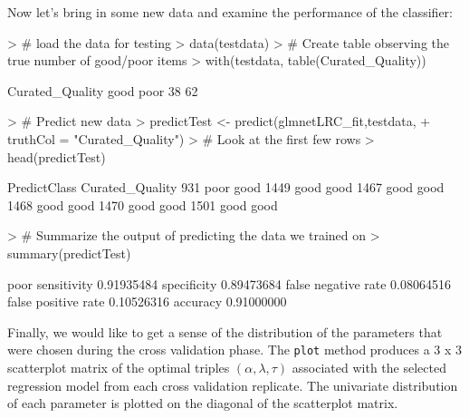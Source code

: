 \documentclass{article}
\begin{document}
\noindent Now let's bring in some new data and examine the performance of the classifier:
\begin{Schunk}
\begin{Sinput}
> # load the data for testing
> data(testdata)
> # Create table observing the true number of good/poor items 
> with(testdata, table(Curated_Quality))
\end{Sinput}
\begin{Soutput}
Curated_Quality
good poor 
  38   62 
\end{Soutput}
\begin{Sinput}
> # Predict new data
> predictTest <- predict(glmnetLRC_fit,testdata,
+                        truthCol = "Curated_Quality")
> # Look at the first few rows
> head(predictTest)
\end{Sinput}
\begin{Soutput}
     PredictClass Curated_Quality
931          poor            good
1449         good            good
1467         good            good
1468         good            good
1470         good            good
1501         good            good
\end{Soutput}
\begin{Sinput}
> # Summarize the output of predicting the data we trained on 
> summary(predictTest)
\end{Sinput}
\begin{Soutput}
                          poor
sensitivity         0.91935484
specificity         0.89473684
false negative rate 0.08064516
false positive rate 0.10526316
accuracy            0.91000000
\end{Soutput}
\end{Schunk}

\noindent Finally, we would like to get a sense of the distribution of the parameters that were chosen during the cross validation phase. The {\tt plot} method produces a 3 x 3 scatterplot matrix of the optimal triples $(\alpha, \lambda, \tau)$ associated with the selected regression model from each cross validation replicate. The univariate distribution of each parameter is plotted on the diagonal of the scatterplot matrix.
\end{document}
